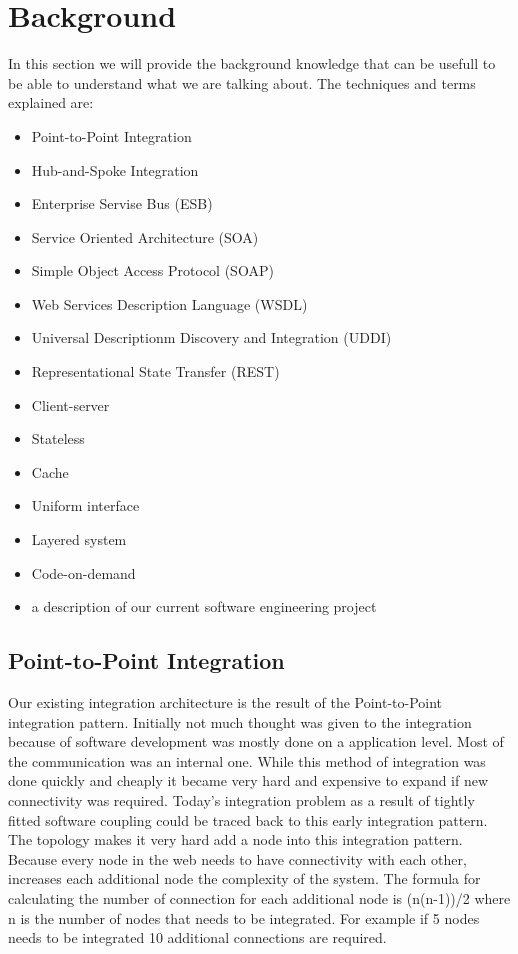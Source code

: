 \documentclass{llncs}
\begin{document}
\section{Background}
In this section we will provide the background knowledge that can be usefull to be able to understand what we are talking about.
The techniques and terms explained are:
\begin{itemize}
\item Point-to-Point Integration
\item Hub-and-Spoke Integration
\item Enterprise Servise Bus (ESB)
\item Service Oriented Architecture (SOA)
\item Simple Object Access Protocol (SOAP)
\item Web Services Description Language (WSDL)
\item Universal Descriptionm Discovery and Integration (UDDI)
\item Representational State Transfer (REST)
\item Client-server
\item Stateless
\item Cache
\item Uniform interface
\item Layered system
\item Code-on-demand
\item a description of our current software engineering project
\end{itemize}

\label{sec:background}

\subsection{Point-to-Point Integration}
Our existing integration architecture is the result of the Point-to-Point integration pattern. Initially not much thought was given to the integration because of software development was mostly done on a application level. Most of the communication was an internal one. While this method of integration was done quickly and cheaply it became very hard and expensive to expand if new connectivity was required. Today's integration problem as a result of tightly fitted software coupling could be traced back to this early integration pattern. The topology makes it very hard add a node into this integration pattern. Because every node in the web needs to have connectivity with each other, increases each additional node the complexity of the system. The  formula for calculating the number of connection for each additional node is (n(n-1))/2 where n is the number of nodes that needs to be integrated. For example if 5 nodes needs to be integrated 10 additional connections are required.
\end{document}
